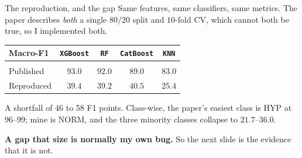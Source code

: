 \documentclass[xcolor=dvipsnames, aspectratio=169]{beamer}
\begin{document}
\begin{frame}{The reproduction, and the gap}
    Same features, same classifiers, same metrics. The paper describes
    \emph{both} a single $80/20$ split and $10$-fold CV, which cannot both be true,
    so I implemented both.

    \vspace{0.5em}
    \begin{center}
    \small
    \begin{tabular}{lcccc}
        \textbf{Macro-F1} & \texttt{XGBoost} & \texttt{RF} & \texttt{CatBoost} & \texttt{KNN} \\[2pt]
        \hline \\[-8pt]
        Published        & $93.0$ & $92.0$ & $89.0$ & $83.0$ \\
        \textcolor{clay}{Reproduced} & \textcolor{clay}{$39.4$} & \textcolor{clay}{$39.2$}
                         & \textcolor{clay}{$40.5$} & \textcolor{clay}{$25.4$} \\
    \end{tabular}
    \end{center}

    \vspace{0.5em}
    A shortfall of \alert{46 to 58 F1 points}. Class-wise, the paper's easiest class
    is HYP at $96$--$99$; mine is NORM, and the three minority classes collapse
    to $21.7$--$36.0$.

    \vspace{0.4em}
    \textbf{\textcolor{sagedeep}{A gap that size is normally my own bug.}}
    So the next slide is the evidence that it is not.
\end{frame}
\end{document}
